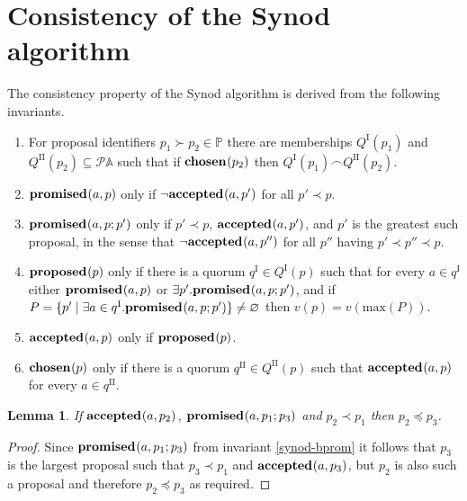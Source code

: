 \documentclass[journal]{IEEEtran}
\newtheorem{lemma}[theorem]{Lemma}
\begin{document}
\pagebreak

\appendices
\section{Consistency of the Synod algorithm}
\label{synod-safety}

The consistency property of the Synod algorithm is derived from the following
invariants.

\begin{enumerate}

\item \label{synod-quorums} For proposal identifiers $p_1 \succ p_2 \in \mathbb
P$ there are memberships $Q^\textrm{I}(p_1)$ and $Q^\textrm{II}(p_2) \subseteq
\mathcal P \mathbb A$ such that if $\mathbf{chosen}_{}(p_2)$ then ${Q^\textrm{I}(p_1)
\frown Q^\textrm{II}(p_2)}$.

\item \label{synod-fprom} $\mathbf{promised}_{}(a,p)$ only if $\neg\mathbf{accepted}_{}(a,p')$ for all
${p' \prec p}$.

\item \label{synod-bprom} $\mathbf{promised}_{}(a,p;p')$ only if $p' \prec p$,
$\mathbf{accepted}_{}(a,p')$, and $p'$ is the greatest such proposal, in the sense that
$\neg\mathbf{accepted}_{}(a,p'')$ for all $p''$ having $p' \prec p'' \prec p$.

\item \label{synod-prop} $\mathbf{proposed}_{}(p)$ only if there is a quorum $q^\textrm{I}
\in Q^\textrm{I}(p)$ such that for every $a \in q^\textrm{I}$ either
$\mathbf{promised}_{}(a,p)$ or $\exists p'.  \mathbf{promised}_{}(a,p;p')$, and if $P = \{ p' \mid
\exists a \in q^\textrm{I}. \mathbf{promised}_{}(a,p;p') \} \ne \varnothing$ then $v(p) =
v(\mathrm{max}(P))$.

\item \label{synod-acc} $\mathbf{accepted}_{}(a,p)$ only if $\mathbf{proposed}_{}(p)$.

\item \label{synod-chosen} $\mathbf{chosen}_{}(p)$ only if there is a quorum
$q^\textrm{II} \in Q^\textrm{II}(p)$ such that $\mathbf{accepted}_{}(a,p)$ for every $a \in
q^\textrm{II}$.

\end{enumerate}

\begin{lemma}\label{synod-acc-bprom}If $\mathbf{accepted}_{}(a,p_2)$, $\mathbf{promised}_{}(a,p_1;p_3)$
and $p_2 \prec p_1$ then $p_2 \preceq p_3$.\end{lemma}

\begin{proof}Since $\mathbf{promised}_{}(a,p_1;p_3)$ from invariant \ref{synod-bprom} it
follows that $p_3$ is the largest proposal such that $p_3 \prec p_1$ and
$\mathbf{accepted}_{}(a,p_3)$, but $p_2$ is also such a proposal and therefore $p_2
\preceq p_3$ as required.  \end{proof}
\end{document}
